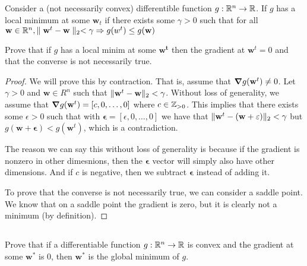 \documentclass{article}
\begin{document}
\newpage
\subsection{}
Consider a (not necessarily convex) differentible function $g: \R^{n} \to \R$. If $g$ has a local minimum at some $\mathbf{w}_{t}$ 
if there exists some $\gamma > 0$ such that for all 
$\mathbf{w} \in \R^{n}, \parallel \mathbf{w}^{t} - \mathbf{w} \parallel_{2} < \gamma \implies g(w^{t}) \leq g(\mathbf{w})$

Prove that if $g$ has a local minim at some $\mathbf{w^{t}}$ then the gradient at $\mathbf{w}^{t} = 0$ and that the converse is not 
necessarily true.

\begin{proof}
    We will prove this by contraction. That is, assume that $\grad g(\mathbf{w}^{t}) \neq 0$.
    Let $\gamma > 0$ and $\mathbf{w} \in R^{n}$ such that 
    $\pnorm{2}{\mathbf{w}^{t} - \mathbf{w}} < \gamma$.  Without loss of generality, we assume that 
    $\grad g(\mathbf{w}^{t}) = [c, 0, \dots, 0]$ where $c \in \Z_{> 0}$. This implies that there exists some $\epsilon > 0$ such that
    with $\mathbf{\epsilon} = [\epsilon, 0, \dots, 0]$ we have that $\pnorm{2}{\mathbf{w}^{t} - (\mathbf{w} + \mathbf{\epsilon})} < \gamma$
    but $g(\mathbf{w} + \mathbf{\epsilon}) < g(\mathbf{w}^{t})$, which is a contradiction.

    The reason we can say this without loss of generality is because if the gradient is nonzero in other dimesnions, then the
    $\mathbf{\epsilon}$ vector will simply also have other dimensions. And if $c$ is negative, then we subtract $\mathbf{\epsilon}$
    instead of adding it.

    To prove that the converse is not necessarily true, we can consider a saddle point. We know that on a saddle point the gradient
    is zero, but it is clearly not a minimum (by definition).
\end{proof}

\newpage
\subsection{}
Prove that if a differentiable function $g: \R^{n} \to \R$ is convex and the gradient at some $\mathbf{w}^{*}$ is 0, then 
$\mathbf{w}^{*}$ is the global minimum of $g$.
\end{document}
